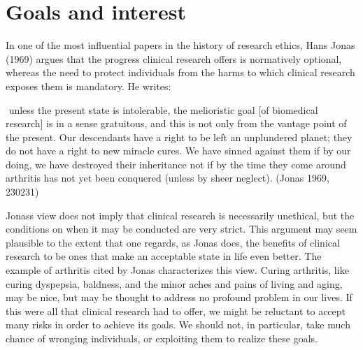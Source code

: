 \documentclass[12p]{article}
\begin{document}
\section{Goals and interest}

 In one of the most influential papers in the history of research ethics, Hans Jonas (1969) argues that the progress clinical research offers is normatively optional, whereas the need to protect individuals from the harms to which clinical research exposes them is mandatory. He writes:

     unless the present state is intolerable, the melioristic goal [of biomedical research] is in a sense gratuitous, and this is not only from the vantage point of the present. Our descendants have a right to be left an unplundered planet; they do not have a right to new miracle cures. We have sinned against them if by our doing, we have destroyed their inheritance not if by the time they come around arthritis has not yet been conquered (unless by sheer neglect). (Jonas 1969, 230231)

Jonass view does not imply that clinical research is necessarily unethical, but the conditions on when it may be conducted are very strict. This argument may seem plausible to the extent that one regards, as Jonas does, the benefits of clinical research to be ones that make an acceptable state in life even better. The example of arthritis cited by Jonas characterizes this view. Curing arthritis, like curing dyspepsia, baldness, and the minor aches and pains of living and aging, may be nice, but may be thought to address no profound problem in our lives. If this were all that clinical research had to offer, we might be reluctant to accept many risks in order to achieve its goals. We should not, in particular, take much chance of wronging individuals, or exploiting them to realize these goals.
\end{document}
